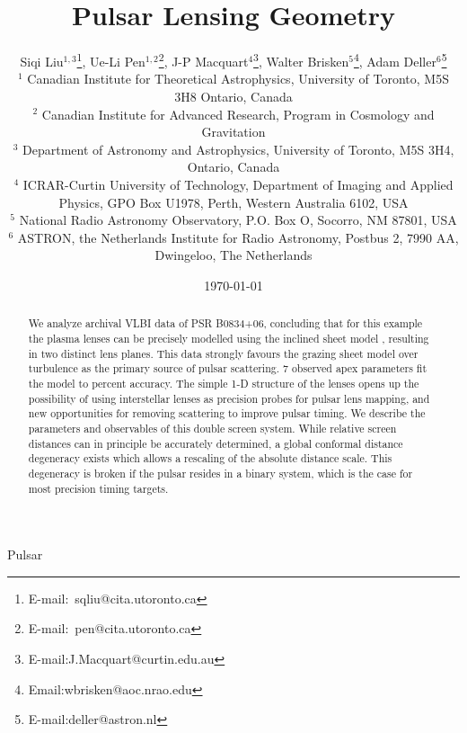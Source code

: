 \documentclass[useAMS,usenatbib]{mn2e}
\begin{document}
\title[Lensing Geometry]{
Pulsar Lensing Geometry
}

\author[Liu et al]{Siqi Liu$^{1,3}$\thanks{E-mail:\ sqliu@cita.utoronto.ca}, Ue-Li
  Pen$^{1,2}$\thanks{E-mail:\ pen@cita.utoronto.ca}, J-P Macquart$^{4}$\thanks{E-mail:J.Macquart@curtin.edu.au},
  Walter Brisken$^{5}$\thanks{Email:wbrisken@aoc.nrao.edu}, Adam Deller$^{6}$\thanks{E-mail:deller@astron.nl}\\
 $^1$ Canadian Institute for Theoretical Astrophysics, University of Toronto, M5S 3H8 Ontario, Canada \\
$^2$ Canadian Institute for Advanced Research, Program in Cosmology
and Gravitation\\
$^3$ Department of Astronomy and Astrophysics, University of Toronto, M5S 3H4, Ontario, Canada\\
$^4$ ICRAR-Curtin University of Technology, Department of Imaging and Applied Physics, GPO Box U1978, Perth, Western Australia 6102, USA \\
$^5$ National Radio Astronomy Observatory, P.O. Box O, Socorro, NM 87801, USA\\
$^6$ ASTRON, the Netherlands Institute for Radio Astronomy, Postbus 2, 7990 AA, Dwingeloo, The Netherlands\\
}

\date{\today}

\pagerange{\pageref{firstpage}--\pageref{lastpage}} 

\maketitle
\label{firstpage}
\begin{abstract}
We analyze archival VLBI data of PSR
B0834+06, concluding that for this example the plasma lenses can be
precisely modelled using the inclined sheet model \citep{2014MNRAS.442.3338P},
resulting in two distinct lens planes.  This data strongly favours the
grazing sheet model over turbulence as the primary source of
pulsar scattering.  7 observed apex parameters fit the model to percent accuracy.
The simple 1-D structure of the lenses opens up
the possibility of using interstellar lenses as precision probes for
pulsar lens mapping, and new opportunities for removing scattering to
improve pulsar timing.
We describe the parameters and observables of this double screen
system.  While relative screen distances can in principle be
accurately determined,
a global conformal distance degeneracy exists which allows a rescaling
of the absolute distance scale.  This degeneracy is broken if the
pulsar resides in a binary system, which is the case for most
precision timing targets.

\end{abstract}
\begin{keywords}
Pulsar
\end{keywords}
\end{document}
